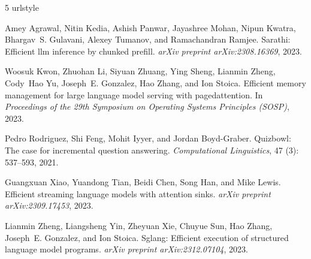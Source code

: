 \documentclass{article}
\begin{document}

\begin{thebibliography}{5}
\providecommand{\natexlab}[1]{#1}
\providecommand{\url}[1]{\texttt{#1}}
\expandafter\ifx\csname urlstyle\endcsname\relax
  \providecommand{\doi}[1]{doi: #1}\else
  \providecommand{\doi}{doi: \begingroup \urlstyle{rm}\Url}\fi

Amey Agrawal, Nitin Kedia, Ashish Panwar, Jayashree Mohan, Nipun Kwatra, Bhargav~S. Gulavani, Alexey Tumanov, and Ramachandran Ramjee.
\newblock Sarathi: Efficient llm inference by chunked prefill.
\newblock \emph{arXiv preprint arXiv:2308.16369}, 2023.

Woosuk Kwon, Zhuohan Li, Siyuan Zhuang, Ying Sheng, Lianmin Zheng, Cody~Hao Yu, Joseph~E. Gonzalez, Hao Zhang, and Ion Stoica.
\newblock Efficient memory management for large language model serving with pagedattention.
\newblock In \emph{Proceedings of the 29th Symposium on Operating Systems Principles (SOSP)}, 2023.

Pedro Rodriguez, Shi Feng, Mohit Iyyer, and Jordan Boyd-Graber.
\newblock Quizbowl: The case for incremental question answering.
\newblock \emph{Computational Linguistics}, 47 (3): 537--593, 2021.

Guangxuan Xiao, Yuandong Tian, Beidi Chen, Song Han, and Mike Lewis.
\newblock Efficient streaming language models with attention sinks.
\newblock \emph{arXiv preprint arXiv:2309.17453}, 2023.

Lianmin Zheng, Liangsheng Yin, Zheyuan Xie, Chuyue Sun, Hao Zhang, Joseph~E. Gonzalez, and Ion Stoica.
\newblock Sglang: Efficient execution of structured language model programs.
\newblock \emph{arXiv preprint arXiv:2312.07104}, 2023.

\end{thebibliography}
\end{document}
